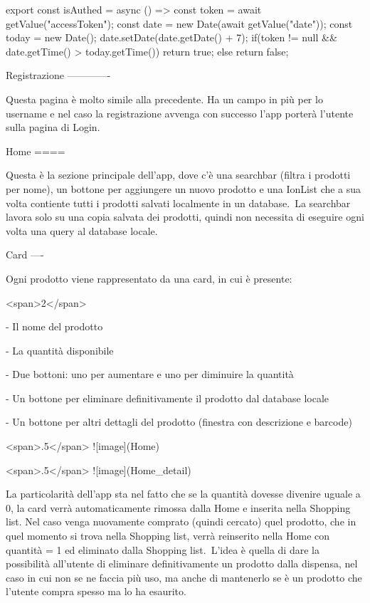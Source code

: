      export const isAuthed = async () =>{
      const token = await getValue("accessToken");
      const date = new Date(await getValue("date"));
      const today = new Date();
      date.setDate(date.getDate() + 7);
      if(token != null && date.getTime() > today.getTime())
        return true;
      else
        return false;
    }

Registrazione
-------------

Questa pagina è molto simile alla precedente. Ha un campo in più per lo
username e nel caso la registrazione avvenga con successo l’app porterà
l’utente sulla pagina di Login.

Home
====

Questa è la sezione principale dell’app, dove c’è una searchbar (filtra
i prodotti per nome), un bottone per aggiungere un nuovo prodotto e una
IonList che a sua volta contiente tutti i prodotti salvati localmente in
un database.\
La searchbar lavora solo su una copia salvata dei prodotti, quindi non
necessita di eseguire ogni volta una query al database locale.

Card
----

Ogni prodotto viene rappresentato da una card, in cui è presente:

<span>2</span>

-   Il nome del prodotto

-   La quantità disponibile

-   Due bottoni: uno per aumentare e uno per diminuire la quantità

-   Un bottone per eliminare definitivamente il prodotto dal database
    locale

-   Un bottone per altri dettagli del prodotto (finestra con descrizione
    e barcode)

<span>.5</span> ![image](Home)

<span>.5</span> ![image](Home_detail)

La particolarità dell’app sta nel fatto che se la quantità dovesse
divenire uguale a 0, la card verrà automaticamente rimossa dalla Home e
inserita nella Shopping list. Nel caso venga nuovamente comprato (quindi
cercato) quel prodotto, che in quel momento si trova nella Shopping
list, verrà reinserito nella Home con quantità = 1 ed eliminato dalla
Shopping list.\
L’idea è quella di dare la possibilità all’utente di eliminare
definitivamente un prodotto dalla dispensa, nel caso in cui non se ne
faccia più uso, ma anche di mantenerlo se è un prodotto che l’utente
compra spesso ma lo ha esaurito.

